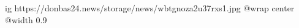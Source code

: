  
 
 
 
 

\ifcmt
  ig https://donbas24.news/storage/news/wbtgnoza2u37rxs1.jpg
  @wrap center
  @width 0.9
\fi
